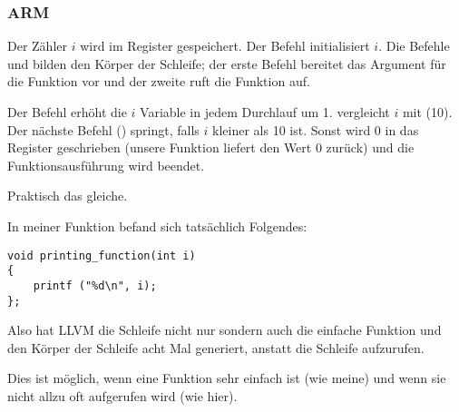 \subsubsection{ARM}

\myparagraph{\NonOptimizingKeilVI (\ARMMode)}



Der Zähler $i$ wird im Register  gespeichert. 
Der Befehl  initialisiert $i$.
Die Befehle  und  bilden den Körper
der Schleife; der erste Befehl bereitet das Argument für die \ttf Funktion vor
und der zweite ruft die Funktion auf.

Der Befehl  erhöht die $i$ Variable in jedem Durchlauf um
1.
 vergleicht $i$ mit  (10). 
Der nächste Befehl  () springt, falls $i$ kleiner
als 10 ist. Sonst wird 0 in das Register  geschrieben (unsere Funktion
liefert den Wert 0 zurück) und die Funktionsausführung wird beendet.

\myparagraph{\OptimizingKeilVI (\ThumbMode)}



Praktisch das gleiche.

\myparagraph{\OptimizingXcodeIV (\ThumbTwoMode)}
\label{ARM_unrolled_loops}



In meiner \ttf Funktion befand sich tatsächlich Folgendes:

\begin{lstlisting}[style=customc]
void printing_function(int i)
{
    printf ("%d\n", i);
};
\end{lstlisting}

Also hat LLVM die Schleife nicht nur  sondern auch die einfache
Funktion \ttf {} und den Körper der Schleife acht Mal generiert,
anstatt die Schleife aufzurufen. 

Dies ist möglich, wenn eine Funktion sehr einfach ist (wie meine) und wenn sie
nicht allzu oft aufgerufen wird (wie hier).







